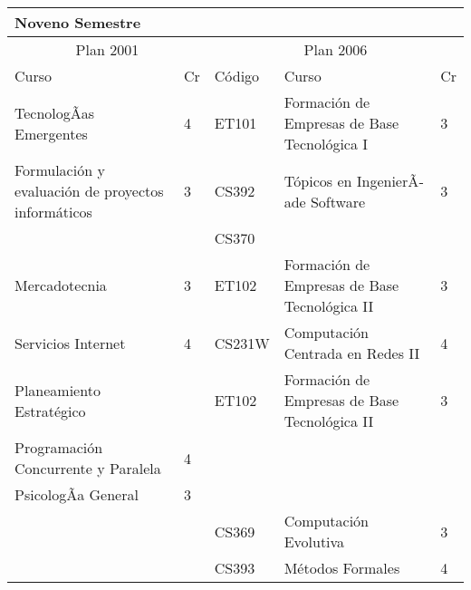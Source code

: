 \begin{center}
\begin{tabularx}{0.95\textwidth}{|p{4cm}|p{1cm}||p{2cm}|X|p{1cm}|}\hline
\multicolumn{5}{|l|}{\textbf{Noveno Semestre}} \\ \hline
\multicolumn{2}{|c|}{Plan 2001} & \multicolumn{3}{|c|}{Plan 2006} \\ \hline
Curso & Cr & Código & Curso & Cr \\ \hline
TecnologÃ­as Emergentes & 4 & ET101 & Formación de Empresas de Base Tecnológica I & 3 \\ \hline
Formulación y evaluación de proyectos informáticos & 3 & CS392 & Tópicos en IngenierÃ­ade Software & 3 \\ \hline
 &  & CS370 &  & \\ \hline
Mercadotecnia & 3 & ET102 & Formación de Empresas de Base Tecnológica II & 3 \\ \hline
Servicios Internet & 4 & CS231W & Computación Centrada en Redes II & 4 \\ \hline
Planeamiento Estratégico &  & ET102 & Formación de Empresas de Base Tecnológica II & 3 \\ \hline
Programación Concurrente y Paralela & 4 &  &  & \\ \hline
PsicologÃ­a General & 3 &  &  & \\ \hline
 &  & CS369 & Computación Evolutiva & 3 \\ \hline
 &  & CS393 & Métodos Formales & 4 \\ \hline
\end{tabularx}
\end{center}

